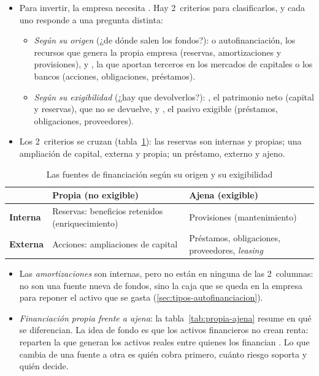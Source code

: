 \documentclass[11pt]{article}
\begin{document}
\begin{itemize}
\item Para invertir, la empresa necesita . Hay 2~criterios para clasificarlos, y cada uno responde a una pregunta distinta:
  \begin{itemize}
  \item \emph{Según su origen} (¿de dónde salen los fondos?):  o autofinanciación, los recursos que genera la propia empresa (reservas, amortizaciones y provisiones), y , la que aportan terceros en los mercados de capitales o los bancos (acciones, obligaciones, préstamos).
  \item \emph{Según su exigibilidad} (¿hay que devolverlos?): , el patrimonio neto (capital y reservas), que no se devuelve, y , el pasivo exigible (préstamos, obligaciones, proveedores).
  \end{itemize}
\item Los 2~criterios se cruzan (tabla~\ref{tab:matriz-fuentes}): las reservas son internas y propias; una ampliación de capital, externa y propia; un préstamo, externo y ajeno.
\end{itemize}

\begin{table}[H]
\centering
\caption{Las fuentes de financiación según su origen y su exigibilidad}\label{tab:matriz-fuentes}
\begin{tabular}{>{\centering\arraybackslash}m{2.6cm}>{\centering\arraybackslash}m{5.6cm}>{\centering\arraybackslash}m{5.6cm}}
\toprule
\rowcolor{tceeazulpalido} & \textbf{Propia (no exigible)} & \textbf{Ajena (exigible)} \\
\midrule
\textbf{Interna} & \cellcolor{tceesalvia}\textcolor{tceeverde}{Reservas: beneficios retenidos (enriquecimiento)} & \textcolor{tceeverde}{Provisiones (mantenimiento)} \\
\textbf{Externa} & \textcolor{tceeazul}{Acciones: ampliaciones de capital} & \textcolor{tceedorado}{Préstamos, obligaciones, proveedores, \emph{leasing}} \\
\bottomrule
\end{tabular}
\end{table}

\begin{itemize}
\item Las \emph{amortizaciones} son internas, pero no están en ninguna de las 2~columnas: no son una fuente nueva de fondos, sino la caja que se queda en la empresa para reponer el activo que se gasta (\ref{sec:tipos-autofinanciacion}).
\item \emph{Financiación propia frente a ajena}: la tabla~\ref{tab:propia-ajena} resume en qué se diferencian. La idea de fondo es que los activos financieros no crean renta: reparten la que generan los activos reales entre quienes los financian . Lo que cambia de una fuente a otra es quién cobra primero, cuánto riesgo soporta y quién decide.
\end{itemize}
\end{document}
